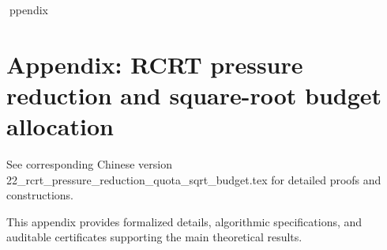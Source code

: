 ppendix

\section*{Appendix: RCRT pressure reduction and square-root budget allocation}

See corresponding Chinese version 22_rcrt_pressure_reduction_quota_sqrt_budget.tex for detailed proofs and constructions.

This appendix provides formalized details, algorithmic specifications, and auditable certificates supporting the main theoretical results.
